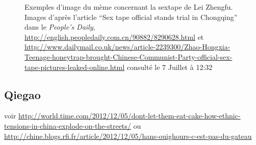 \begin{figure}[h!]
    \hfill
    \hfill
    \caption{
      Exemples d'image du mème concernant la sextape de Lei Zhengfu. Images d'après l'article ``Sex tape official stands trial in Chongqing'' dans le \textit{People's Daily}, \url{http://english.peopledaily.com.cn/90882/8290628.html} et \url{http://www.dailymail.co.uk/news/article-2239300/Zhao-Hongxia-Teenage-honeytrap-brought-Chinese-Communist-Party-official-sex-tape-pictures-leaked-online.html} consulté le 7 Juillet à 12:32
    }
\end{figure}




\clearpage
\subsection{Qiegao}

voir \url{http://world.time.com/2012/12/05/dont-let-them-eat-cake-how-ethnic-tensions-in-china-explode-on-the-streets/} ou \url{http://chine.blogs.rfi.fr/article/2012/12/05/hans-ouighours-c-est-pas-du-gateau}


